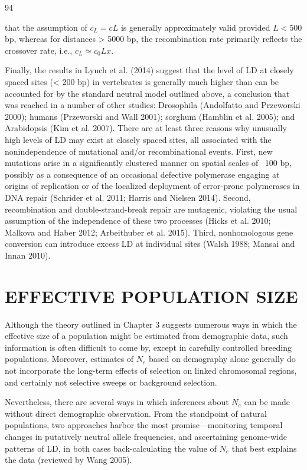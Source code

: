 \documentclass{article}
\begin{document}
94

that the assumption of  $ c_L = cL $ is generally approximately valid provided  $ L < 500 $ bp, whereas for distances > 5000 bp, the recombination rate primarily reflects the crossover rate, i.e.,  $ c_L \simeq c_0Lx $.

Finally, the results in Lynch et al. (2014) suggest that the level of LD at closely spaced sites (< 200 bp) in vertebrates is generally much higher than can be accounted for by the standard neutral model outlined above, a conclusion that was reached in a number of other studies: Drosophila (Andolfatto and Przeworski 2000); humans (Przeworski and Wall 2001); sorghum (Hamblin et al. 2005); and Arabidopsis (Kim et al. 2007). There are at least three reasons why unusually high levels of LD may exist at closely spaced sites, all associated with the nonindependence of mutational and/or recombinational events. First, new mutations arise in a significantly clustered manner on spatial scales of ~100 bp, possibly as a consequence of an occasional defective polymerase engaging at origins of replication or of the localized deployment of error-prone polymerases in DNA repair (Schrider et al. 2011; Harris and Nielsen 2014). Second, recombination and double-strand-break repair are mutagenic, violating the usual assumption of the independence of these two processes (Hicks et al. 2010; Malkova and Haber 2012; Arbeithuber et al. 2015). Third, nonhomologous gene conversion can introduce excess LD at individual sites (Walsh 1988; Mansai and Innan 2010).

\section{EFFECTIVE POPULATION SIZE}
Although the theory outlined in Chapter 3 suggests numerous ways in which the effective size of a population might be estimated from demographic data, such information is often difficult to come by, except in carefully controlled breeding populations. Moreover, estimates of  $ N_{e} $ based on demography alone generally do not incorporate the long-term effects of selection on linked chromosomal regions, and certainly not selective sweeps or background selection.

Nevertheless, there are several ways in which inferences about  $ N_{e} $ can be made without direct demographic observation. From the standpoint of natural populations, two approaches harbor the most promise—monitoring temporal changes in putatively neutral allele frequencies, and ascertaining genome-wide patterns of LD, in both cases back-calculating the value of  $ N_{e} $ that best explains the data (reviewed by Wang 2005).
\end{document}
